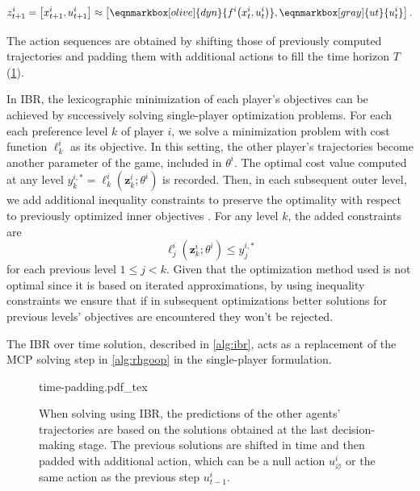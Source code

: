 \vspace{1em}
$$
z^i_{t+1} = \left[x^i_{t+1}, u^i_{t+1}\right] \approx \left[\eqnmarkbox[olive]{dyn}{f^i\big(x^i_t, u^i_t\big)}, \eqnmarkbox[gray]{ut}{u^i_t}\right].
$$
\vspace{.75em}

\noindent
The action sequences are obtained by shifting those of previously computed trajectories
and padding them with additional actions to fill the time horizon \(T\) (\cref{fig:time-padding}).

In IBR, the lexicographic minimization of each player's objectives
can be achieved by successively solving single-player optimization problems.
For each each preference level \(k\) of player \(i\), we solve a minimization problem
with cost function \(\ell^i_k\) as its objective. In this setting, the other
player's trajectories become another parameter of the game, included in \(\theta^i\).
The optimal cost value computed at any level
\(y_k^{i,*} = \ell^i_k(\mathbf{z}^i_{k}; \theta^i)\) is recorded.
Then, in each subsequent outer level, we add additional inequality constraints
to preserve the optimality with respect to
previously optimized inner objectives \cite{kochenderfer:2019}.
For any level \(k\), the added constraints are
$$\ell^i_j\left(\mathbf{z}^i_{k}; \theta^i\right) \leq y_j^{i,*}$$
for each previous level \(1 \leq j < k\).
Given that the optimization method used is not optimal
since it is based on iterated approximations,
by using inequality constraints we ensure that if in subsequent optimizations
better solutions for previous levels' objectives are encountered they won't be rejected.

The IBR over time solution, described in \cref{alg:ibr}, acts as a replacement
of the MCP solving step in \cref{alg:rhgoop}
in the single-player formulation.

\begin{figure}
    \centering
\def\svgwidth{0.6\linewidth}
{time-padding.pdf_tex}
\caption{
    When solving using IBR, the predictions of the other agents' trajectories
    are based on the solutions obtained at the last decision-making stage.
    The previous solutions are shifted in time and then padded with additional action,
    which can be a null action $u_\varnothing^i$ or the same action as the previous step $u_{t-1}^i$.
    }
\label{fig:time-padding}
\end{figure}

